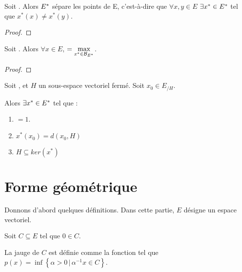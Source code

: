 \begin{corollary}
	Soit . Alors $E^{*}$ sépare les points de
	E, c'est-à-dire que $\forall x, y \in E$ $\exists x^{*} \in E^{*}$ tel
	que $x^{*}(x) \neq x^{*}(y)$.
\end{corollary}

\begin{proof}
	
\end{proof}

\begin{corollary}
	Soit . Alors $\forall x \in E$,  
	$ = \max\limits_{x^{*} \in \mathcal{B}_{E^{*}}}$.
\end{corollary}

\begin{proof}
	
\end{proof}

\begin{corollary}
	Soit , et $H$ un sous-espace vectoriel fermé.
	Soit $x_{0} \in E_{/H}$.

	Alors $\exists x^{*} \in E^{*}$ tel que :

	\begin{enumerate}
		\item {} $ = 1$.
		\item $x^{*}(x_{0}) = d(x_{0}, H)$
		\item $H \subseteq ker(x^{*})$
	\end{enumerate}
\end{corollary}

\section{Forme géométrique}

Donnons d'abord quelques définitions. Dans cette partie, $E$ désigne un espace
vectoriel.

\begin{definition} [Jauge]
	Soit $C \subseteq E$ tel que $0 \in C$.

	La jauge de $C$ est définie comme la fonction 
	tel que $p(x) = \inf\left\{ \alpha > 0 \, | \, \alpha^{-1}x \in C\right\}$.
\end{definition}


